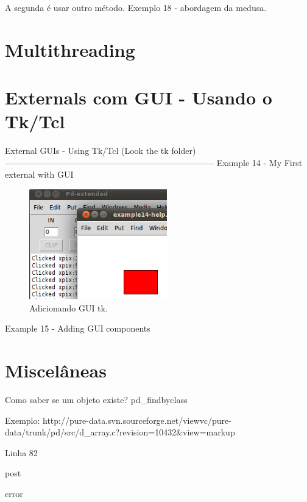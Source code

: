 \documentclass[10pt,a4paper]{report}
\begin{document}
A segunda é usar outro método. Exemplo 18 - abordagem da medusa.


\chapter{Multithreading}


\chapter{Externals com GUI - Usando o Tk/Tcl}
External GUIs - Using Tk/Tcl (Look the tk folder)
--------------------------------------------------------------------------
Example 14 - My First external with GUI
\begin{figure}[h!]
	\centering
	\includegraphics[height=180]{./images/example14}
	\caption{Adicionando GUI tk.}
\end{figure}

Example 15 - Adding GUI components


\chapter{Miscelâneas}
Como saber se um objeto existe?
pd_findbyclass

Exemplo: http://pure-data.svn.sourceforge.net/viewvc/pure-data/trunk/pd/src/d_array.c?revision=10432&view=markup 

Linha 82


post

error
\end{document}
